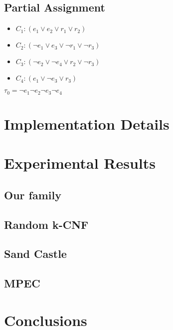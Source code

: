\documentclass{llncs}
\begin{document}
\subsection{Partial Assignment}
\begin{itemize}
  \item[] $C_1: (e_1 \vee e_2 \vee r_1 \vee r_2)$
  \item[] $C_2: (\neg e_1 \vee e_3 \vee \neg r_1 \vee \neg r_3)$
  \item[] $C_3: (\neg e_2 \vee \neg e_4 \vee r_2 \vee \neg r_3)$
  \item[] $C_4: (e_1 \vee \neg e_3 \vee r_3)$
\end{itemize}
$\tau_0=\neg e_1 \neg e_2 \neg e_3 \neg e_4$
\section{Implementation Details}\label{sec:implement}
\section{Experimental Results}\label{sec:experiment}
\subsection{Our family}
\subsection{Random k-CNF}
\subsection{Sand Castle}
\subsection{MPEC}

\section{Conclusions}\label{sec:conclusion}
\end{document}
